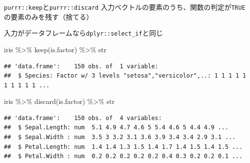 \documentclass[
  ignorenonframetext,
  aspectratio=169]{beamer}
\newenvironment{Shaded}{\begin{snugshade}}{\end{snugshade}}
\newcommand{\FunctionTok}[1]{\textcolor[rgb]{0.00,0.00,0.00}{#1}}
\newcommand{\NormalTok}[1]{#1}
\newcommand{\SpecialCharTok}[1]{\textcolor[rgb]{0.00,0.00,0.00}{#1}}
\begin{document}
\begin{frame}[fragile]{\texttt{purrr::keep}と\texttt{purrr::discard}}
\protect\hypertarget{purrrkeepux3068purrrdiscard}{}
入力ベクトルの要素のうち、関数の判定が\texttt{TRUE}の要素のみを残す（捨てる）

入力がデータフレームなら\texttt{dplyr::select\_if}と同じ

\begin{Shaded}
\begin{Highlighting}[]
\NormalTok{iris }\SpecialCharTok{\%\textgreater{}\%} \FunctionTok{keep}\NormalTok{(is.factor) }\SpecialCharTok{\%\textgreater{}\%}\NormalTok{ str}
\end{Highlighting}
\end{Shaded}

\begin{verbatim}
## 'data.frame':    150 obs. of  1 variable:
##  $ Species: Factor w/ 3 levels "setosa","versicolor",..: 1 1 1 1 1 1 1 1 1 1 ...
\end{verbatim}

\begin{Shaded}
\begin{Highlighting}[]
\NormalTok{iris }\SpecialCharTok{\%\textgreater{}\%} \FunctionTok{discard}\NormalTok{(is.factor) }\SpecialCharTok{\%\textgreater{}\%}\NormalTok{ str}
\end{Highlighting}
\end{Shaded}

\begin{verbatim}
## 'data.frame':    150 obs. of  4 variables:
##  $ Sepal.Length: num  5.1 4.9 4.7 4.6 5 5.4 4.6 5 4.4 4.9 ...
##  $ Sepal.Width : num  3.5 3 3.2 3.1 3.6 3.9 3.4 3.4 2.9 3.1 ...
##  $ Petal.Length: num  1.4 1.4 1.3 1.5 1.4 1.7 1.4 1.5 1.4 1.5 ...
##  $ Petal.Width : num  0.2 0.2 0.2 0.2 0.2 0.4 0.3 0.2 0.2 0.1 ...
\end{verbatim}
\end{frame}
\end{document}
